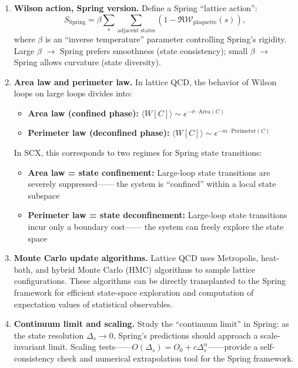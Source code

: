 \documentclass[12pt,a4paper]{article}
\theoremstyle{remark}
\begin{document}
\begin{enumerate}[label=\textbf{(L\arabic*)}]
    \item \textbf{Wilson action, Spring version.} Define a Spring ``lattice action'':
    \begin{equation}
        S_{\text{Spring}} = \beta \sum_{s} \sum_{\text{adjacent states}}
        (1 - \Re \mathcal{W}_{\text{plaquette}}(s)),
    \end{equation}
    where $\beta$ is an ``inverse temperature'' parameter controlling Spring's rigidity.
    Large $\beta$ $\to$ Spring prefers smoothness (state consistency); small $\beta$ $\to$ Spring allows curvature (state diversity).

    \item \textbf{Area law and perimeter law.} In lattice QCD, the behavior of Wilson loops on large loops divides into:
    \begin{itemize}
        \item \textbf{Area law (confined phase):} $\langle W[C] \rangle \sim e^{-\sigma \cdot \text{Area}(C)}$
        \item \textbf{Perimeter law (deconfined phase):} $\langle W[C] \rangle \sim e^{-m \cdot \text{Perimeter}(C)}$
    \end{itemize}
    In SCX, this corresponds to two regimes for Spring state transitions:
    \begin{itemize}
        \item \textbf{Area law = state confinement:} Large-loop state transitions are severely suppressed——
        the system is ``confined'' within a local state subspace
        \item \textbf{Perimeter law = state deconfinement:} Large-loop state transitions incur only a boundary cost——
        the system can freely explore the state space
    \end{itemize}

    \item \textbf{Monte Carlo update algorithms.} Lattice QCD uses Metropolis, heat-bath,
    and hybrid Monte Carlo (HMC) algorithms to sample lattice configurations. These algorithms can be directly transplanted to
    the Spring framework for efficient state-space exploration and computation of expectation values of statistical observables.

    \item \textbf{Continuum limit and scaling.} Study the ``continuum limit'' in Spring:
    as the state resolution $\Delta_s \to 0$, Spring's predictions should approach a scale-invariant limit.
    Scaling tests——$O(\Delta_s) = O_0 + c \Delta_s^\alpha$——provide a self-consistency check and numerical extrapolation tool for the Spring framework.


\end{enumerate}
\end{document}
